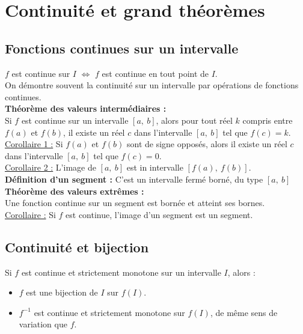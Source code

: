 \section{Continuité et grand théorèmes}\label{sec:continuite-et-grand-theoremes}

\subsection{Fonctions continues sur un intervalle}\label{subsec:fonctions-continues-sur-un-intervalle}

$f$ est continue sur $I$ $\iff$ $f$ est continue en tout point de $I$.\\
On démontre souvent la continuité sur un intervalle par opérations de fonctions continues.\\

\textbf{Théorème des valeurs intermédiaires :}\\
Si $f$ est continue sur un intervalle $[a,\ b]$, alors pour tout réel $k$ compris entre $f(a)$ et $f(b)$, il existe un réel $c$ dans l'intervalle $[a,\ b]$ tel que $f(c) = k$.\\

\underline{Corollaire 1 :} Si $f(a)$ et $f(b)$ sont de signe opposés, alors il existe un réel $c$ dans l'intervalle $[a,\ b]$ tel que $f(c) = 0$.\\
\underline{Corollaire 2 :} L'image de $[a,\ b]$ est in intervalle $[f(a),\ f(b)]$.\\

\textbf{Définition d'un segment :} C'est un intervalle fermé borné, du type $[a,\ b]$\\

\textbf{Théorème des valeurs extrêmes :}\\
Une fonction continue sur un segment est bornée et atteint ses bornes.\\
\underline{Corollaire :} Si $f$ est continue, l'image d'un segment est un segment.\\

\subsection{Continuité et bijection}\label{subsec:continuite-et-bijection}

Si $f$ est continue et strictement monotone sur un intervalle $I$, alors :
\begin{itemize}
    \item $f$ est une bijection de $I$ sur $f(I)$.
    \item $f^{-1}$ est continue et strictement monotone sur $f(I)$, de même sens de variation que $f$.
\end{itemize}

